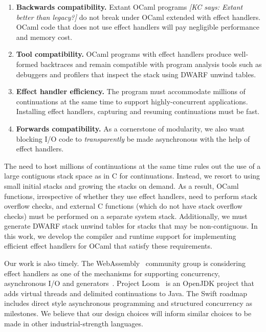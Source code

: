 \documentclass[sigplan,screen]{acmart}
\newcommand{\kc}[1]{{\color{red} {\it [KC says: #1]}}}
\begin{document}
\begin{enumerate}[label=R\arabic*]
	\item \textbf{Backwards compatibility.} Extant OCaml programs \kc{Extant
		better than legacy?} do not break under OCaml extended with effect
		handlers. OCaml code that does not use effect handlers will pay negligible
		performance and memory cost.

	\item \textbf{Tool compatibility.} OCaml programs with effect handlers
		produce well-formed backtraces and remain compatible with program analysis
		tools such as debuggers and profilers that inspect the stack using DWARF
		unwind tables.

	\item \textbf{Effect handler efficiency.} The program must accommodate
		millions of continuations at the same time to support highly-concurrent
		applications. Installing effect handlers, capturing and resuming
		continuations must be fast.

	\item \textbf{Forwards compatibility.} As a cornerstone of modularity, we
		also want blocking I/O code to \emph{transparently} be made asynchronous
		with the help of effect handlers.
\end{enumerate}

The need to host millions of continuations at the same time rules out the use
of a large contiguous stack space as in C for continuations. Instead, we resort
to using small initial stacks and growing the stacks on demand. As a result,
OCaml functions, irrespective of whether they use effect handlers, need to
perform stack overflow checks, and external C functions (which do not have stack
overflow checks) must be performed on a separate system stack. Additionally, we
must generate DWARF stack unwind tables for stacks that may be non-contiguous.
In this work, we develop the compiler and runtime support for implementing
efficient effect handlers for OCaml that satisfy these requirements.

Our work is also timely. The WebAssembly~\cite{Hass17} community group is
considering effect handlers as one of the mechanisms for supporting
concurrency, asynchronous I/O and generators~\cite{WasmProposal}. Project
Loom~\cite{loom} is an OpenJDK project that adds virtual threads and delimited
continuations to Java. The Swift roadmap~\cite{swift} includes direct style
asynchronous programming and structured concurrency as milestones. We believe
that our design choices will inform similar choices to be made in other
industrial-strength languages.
\end{document}
